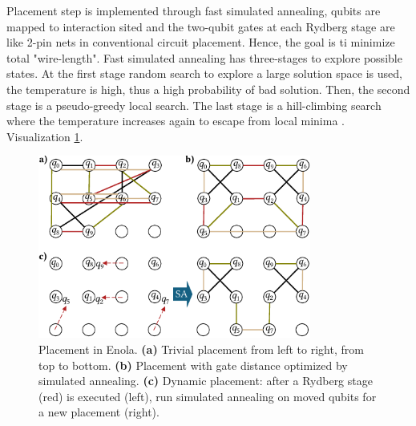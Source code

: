 Placement step is implemented through fast simulated annealing, 
qubits are mapped to interaction sited and the two-qubit
gates at each Rydberg stage are like 2-pin nets in conventional
circuit placement. Hence, the goal is ti minimize total "wire-length".
Fast simulated annealing has three-stages to explore possible states.
At the first stage random search to explore a large solution space is used, the temperature is high, 
thus a high probability of bad solution.
Then, the second stage is a pseudo-greedy local search. 
The last stage is a hill-climbing search where
the temperature increases again to escape from local minima \parencite{Tan_2025_Enola}. 
Visualization \ref{fig:placement_Enola}.
\begin{figure}[htbp]
  \centering
    \includegraphics[width=0.8\textwidth]{figures/placement_Enola.pdf}
    \caption{ Placement in Enola. 
    \textbf{(a)} Trivial placement from left to right, from top to bottom. 
    \textbf{(b)} Placement with gate distance optimized by simulated annealing. 
    \textbf{(c)} Dynamic placement: after a Rydberg stage (red) is executed (left), run simulated
    annealing on moved qubits for a new placement (right). \parencite{Tan_2025_Enola}}
    \label{fig:placement_Enola}
\end{figure}

